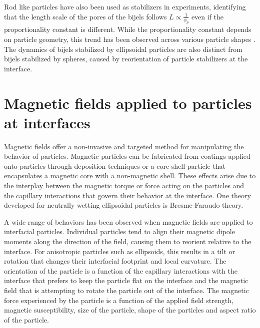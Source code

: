 Rod like particles have also been used as stabilizers in experiments, identifying that the length scale of the pores of 
the bijels follows $ L \propto \frac{1}{\phi_p} $ even if the proportionality constant is different. While the proportionality constant depends on 
particle geometry, this trend has been observed across various particle shapes 
\cite{hijnen_bijels_2015, madivala_exploiting_2009, gunther_timescales_2014, daware_emulsions_2015, loudet_capillary_2005, cheng_shape-anisotropic_2013}.
The dynamics of bijels stabilized by ellipsoidal particles are also distinct from bijels stabilized by spheres, caused by reorientation of particle
stabilizers at the interface. 

\section{Magnetic fields applied to particles at interfaces}

Magnetic fields offer a non-invasive and targeted method for manipulating the behavior of particles. Magnetic particles can be fabricated from
coatings applied onto particles through deposition techniques or a core-shell particle that encapsulates a magnetic core with a non-magnetic shell. 
\cite{fei_magneto-capillary_2020, nakayama_stimuli-responsive_2018} These effects arise due to the interplay between the magnetic torque or force 
acting on the particles and the capillary interactions that govern their behavior at the interface. One theory developed for neutrally wetting ellipsoidal 
particles is Bresme-Faraudo theory. \cite{bresme_orientational_2007, davies_interface_2014}

A wide range of behaviors has been observed when magnetic fields are applied to interfacial particles. Individual particles tend to align their magnetic 
dipole moments along the direction of the field, causing them to reorient relative to the interface. \cite{kim_bijels_2010}
For anisotropic particles such as ellipsoids, this results in a tilt or rotation that changes their interfacial footprint and local curvature. 
\cite{davies_assembling_2014, davies_interface_2014} The orientation of the particle is a function of the capillary interactions with the interface that 
prefers to keep the particle flat on the interface and the magnetic field that is attempting to rotate the particle out of the interface. The magnetic force
experienced by the particle is a function of the applied field strength, magnetic susceptibility, size of the particle, shape of the particles 
and aspect ratio of the particle. 

